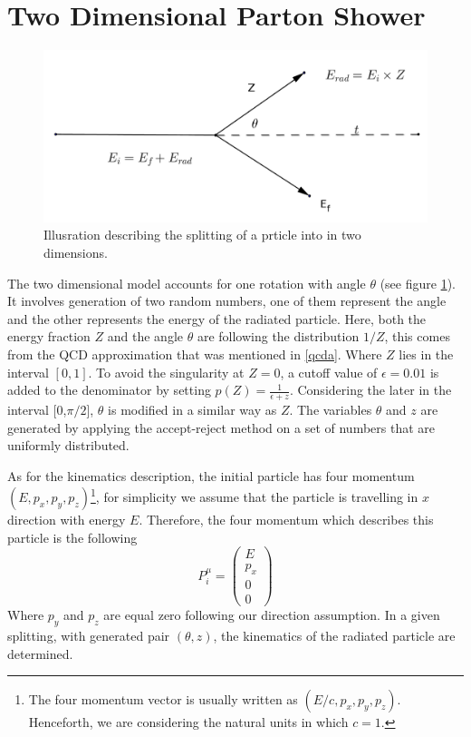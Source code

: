 \section{Two Dimensional Parton Shower}

\begin{figure}[hbtp]
\centering
\includegraphics[scale=.35]{images/tt.png}
\caption{Illusration describing the splitting of a prticle into in two dimensions.}\label{fig:tt}
\end{figure}

The two dimensional model accounts for one rotation with angle $\theta$ (see figure \ref{fig:tt}). It involves
generation of two random numbers, one of them represent the angle and the other represents the energy of the radiated particle. Here, both the energy fraction $Z$ and the angle $\theta$ are following the distribution $1/Z$, this comes from the QCD approximation that was mentioned in \ref{qcda}.
Where $Z$ lies in the interval $[0, 1]$.
To avoid the singularity at $Z = 0$, a cutoff value of $\epsilon = 0.01$ is added to the denominator by setting  $p(Z) = \frac{1}{\epsilon + z}$. Considering the later in the interval [0,$\pi/2$], $\theta$ is modified in a similar way as $Z$. The variables $\theta$ and $z$ are generated by applying the accept-reject method on a set of numbers that are uniformly distributed.

As for the kinematics description, the initial particle has four momentum $(E, p_{x}, p_{y},p_{z})$\footnote{The four momentum vector is usually written as $(E/c, p_{x}, p_{y},p_{z})$. Henceforth, we are considering the natural units in which $c = 1$.}, for simplicity we assume that the particle is travelling in $x$ direction with energy $E$. Therefore, the four momentum which describes this particle is the following 
\begin{equation}
P^{\mu}_{i}  = \begin{pmatrix}
E\\
p_x\\
0\\
0
\end{pmatrix}
\end{equation}
Where $p_y$ and $p_z$ are equal zero following our direction assumption. In a given splitting, with generated pair $(\theta, z)$, the kinematics of the radiated particle are determined.

